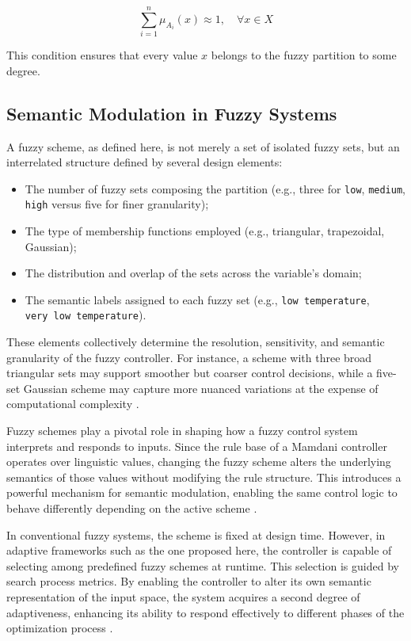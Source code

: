 \begin{equation}
\sum_{i=1}^{n} \mu_{A_i}(x) \approx 1, \quad \forall x \in X
\label{eq:fuzzy-partition}
\end{equation}

This condition ensures that every value $x$ belongs to the fuzzy partition to some degree.


\subsection{Semantic Modulation in Fuzzy Systems}
A fuzzy scheme, as defined here, is not merely a set of isolated fuzzy sets, but an interrelated structure defined by several design elements:

\begin{itemize}
    \item The number of fuzzy sets composing the partition (e.g., three for \texttt{low}, \texttt{medium}, \texttt{high} versus five for finer granularity);
    \item The type of membership functions employed (e.g., triangular, trapezoidal, Gaussian);
    \item The distribution and overlap of the sets across the variable’s domain;
    \item The semantic labels assigned to each fuzzy set (e.g., \texttt{low temperature}, \\ \texttt{very low temperature}).
\end{itemize}

These elements collectively determine the resolution, sensitivity, and semantic granularity of the fuzzy controller. For instance, a scheme with three broad triangular sets may support smoother but coarser control decisions, while a five-set Gaussian scheme may capture more nuanced variations at the expense of computational complexity \parencite{sadollah2018introductory, pedrycz2015designing}.

Fuzzy schemes play a pivotal role in shaping how a fuzzy control system interprets and responds to inputs. Since the rule base of a Mamdani controller operates over linguistic values, changing the fuzzy scheme alters the underlying semantics of those values without modifying the rule structure. This introduces a powerful mechanism for semantic modulation, enabling the same control logic to behave differently depending on the active scheme \parencite{dombi2021modifiers}.

In conventional fuzzy systems, the scheme is fixed at design time. However, in adaptive frameworks such as the one proposed here, the controller is capable of selecting among predefined fuzzy schemes at runtime. This selection is guided by search process metrics. By enabling the controller to alter its own semantic representation of the input space, the system acquires a second degree of adaptiveness, enhancing its ability to respond effectively to different phases of the optimization process \parencite{valdez2014survey, diaz2017new}.

